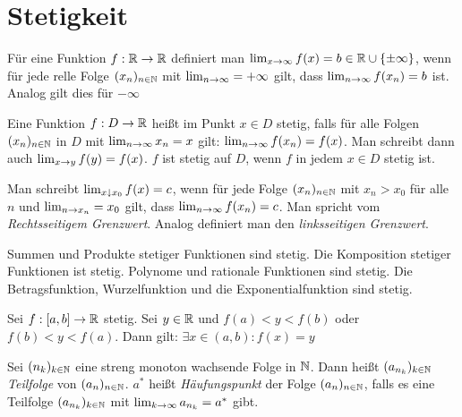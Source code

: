 \documentclass[]{article}
\begin{document}
\section{Stetigkeit}
\begin{definition}
	Für eine Funktion $f : \mathbb{R} \rightarrow \mathbb{R}$ definiert man $\lim_{x \rightarrow \infty} f(x) = b \in \mathbb{R} \cup \{\pm \infty\}$, wenn für jede relle Folge $(x_n)_{n \in \mathbb{N}}$ mit $\lim_{n \rightarrow \infty} = + \infty$ gilt, dass $\lim_{n \rightarrow \infty} f(x_n) = b$ ist. Analog gilt dies für $- \infty$
\end{definition}

\begin{definition}[Stetigkeit]
	Eine Funktion $f : D \rightarrow \mathbb{R}$ heißt im Punkt $x \in D$ stetig, falls für alle Folgen $(x_n)_{n \in \mathbb{N}}$ in $D$ mit $\lim_{n \rightarrow \infty} x_n = x$ gilt: $\lim_{n \rightarrow \infty} f(x_n) = f(x)$. Man schreibt dann auch $\lim_{x \rightarrow y} f(y) = f(x)$. $f$ ist stetig auf $D$, wenn $f$ in jedem $x \in D$ stetig ist. 
\end{definition}

\begin{definition}
	Man schreibt $\lim_{x \downarrow x_0} f(x) = c$, wenn für jede Folge $(x_n)_{n \in \mathbb{N}}$ mit $x_n > x_0$ für alle $n$ und $\lim_{n \rightarrow x_n} = x_0$ gilt, dass $\lim_{n \rightarrow \infty} f(x_n) = c$. Man spricht vom \emph{Rechtsseitigem Grenzwert}. Analog definiert man den \emph{linksseitigen Grenzwert}.
\end{definition}

\begin{satz}
	Summen und Produkte stetiger Funktionen sind stetig. Die Komposition stetiger Funktionen ist stetig. Polynome und rationale Funktionen sind stetig. Die Betragsfunktion, Wurzelfunktion und die Exponentialfunktion sind stetig.
\end{satz}

\begin{satz}[Zwischenwertsatz]
	Sei $f : [a,b] \rightarrow \mathbb{R}$ stetig. Sei $y \in \mathbb{R}$ und $f(a) < y < f(b)$ oder $f(b) < y < f(a)$. Dann gilt: $\exists x \in (a,b) : f(x) = y$
\end{satz}

\begin{satz}
	Sei $(n_k)_{k \in \mathbb{N}}$ eine streng monoton wachsende Folge in $\mathbb{N}$. Dann heißt  $(a_{n_k})_{k \in \mathbb{N}}$ \emph{Teilfolge} von $(a_{n})_{n \in \mathbb{N}}$. $a^*$ heißt \emph{Häufungspunkt} der Folge  $(a_{n})_{n \in \mathbb{N}}$, falls es eine Teilfolge  $(a_{n_k})_{k \in \mathbb{N}}$ mit $\lim_{k \rightarrow \infty} a_{n_k} = a^*$ gibt.
\end{satz}
\end{document}
